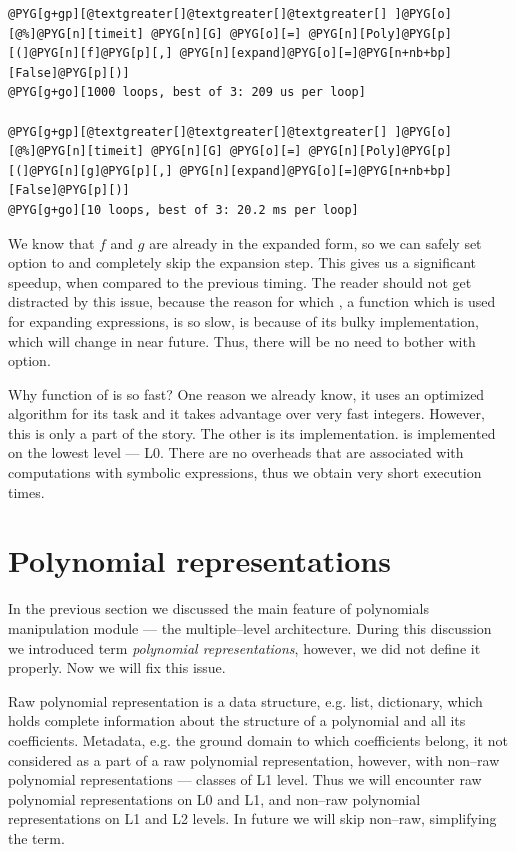 \begin{Verbatim}[commandchars=@\[\]]
@PYG[g+gp][@textgreater[]@textgreater[]@textgreater[] ]@PYG[o][@%]@PYG[n][timeit] @PYG[n][G] @PYG[o][=] @PYG[n][Poly]@PYG[p][(]@PYG[n][f]@PYG[p][,] @PYG[n][expand]@PYG[o][=]@PYG[n+nb+bp][False]@PYG[p][)]
@PYG[g+go][1000 loops, best of 3: 209 us per loop]

@PYG[g+gp][@textgreater[]@textgreater[]@textgreater[] ]@PYG[o][@%]@PYG[n][timeit] @PYG[n][G] @PYG[o][=] @PYG[n][Poly]@PYG[p][(]@PYG[n][g]@PYG[p][,] @PYG[n][expand]@PYG[o][=]@PYG[n+nb+bp][False]@PYG[p][)]
@PYG[g+go][10 loops, best of 3: 20.2 ms per loop]
\end{Verbatim}
\noindent
We know that $f$ and $g$ are already in the expanded form, so we can safely set 
option to  and completely skip the expansion step. This gives us a significant
speedup, when compared to the previous timing. The reader should not get distracted by
this issue, because the reason for which , a function which is used for
expanding expressions, is so slow, is because of its bulky implementation, which will
change in near future. Thus, there will be no need to bother with  option.

Why \href{http://docs.python.org/library/functions.html\#eval}{} function of  is so fast? One reason we already know, it
uses an optimized algorithm for its task and it takes advantage over very fast integers.
However, this is only a part of the story. The other is its implementation. \href{http://docs.python.org/library/functions.html\#eval}{}
is implemented on the lowest level --- L0. There are no overheads that are associated
with computations with symbolic expressions, thus we obtain very short execution times.


\section{Polynomial representations}

In the previous section we discussed the main feature of polynomials manipulation module ---
the multiple--level architecture. During this discussion we introduced term \emph{polynomial
representations}, however, we did not define it properly. Now we will fix this issue.

Raw polynomial representation is a data structure, e.g. list, dictionary, which holds complete
information about the structure of a polynomial and all its coefficients. Metadata, e.g. the
ground domain to which coefficients belong, it not considered as a part of a raw polynomial
representation, however, with non--raw polynomial representations --- classes of L1 level.
Thus we will encounter raw polynomial representations on L0 and L1, and non--raw polynomial
representations on L1 and L2 levels. In future we will skip non--raw, simplifying the term.

